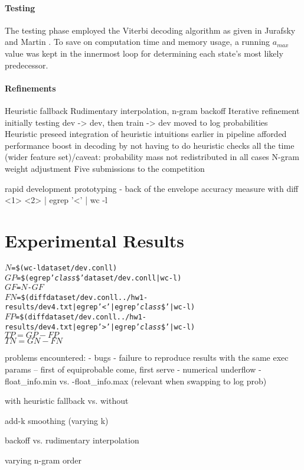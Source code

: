 \documentclass[11pt,a4paper]{article}
\begin{document}
\paragraph{Testing}
The testing phase employed the Viterbi decoding algorithm as given in Jurafsky and
Martin . To save on computation time and memory usage,
a running $a_{max}$ value was kept in the innermost loop for determining each
state's most likely predecessor.

\paragraph{Refinements}
Heuristic fallback
Rudimentary interpolation, n-gram backoff
Iterative refinement initially testing dev -> dev, then train -> dev
moved to log probabilities
Heuristic preseed
integration of heuristic intuitions earlier in pipeline afforded performance boost in decoding by not having to do heuristic checks all the time (wider feature set)/caveat: probability mass not redistributed in all cases
N-gram weight adjustment
Five submissions to the competition

rapid development prototyping - back of the envelope accuracy measure with diff <1> <2> | egrep '<' | wc -l

\section{Experimental Results}

\begin{alltt}
  $N$ = \$(wc -l dataset/dev.conll)
  $GP$ = \$(egrep '\emph{class}\$' dataset/dev.conll | wc -l)
  $GF$ = $N$ - $GF$
  $FN$ = \$(diff dataset/dev.conll ../hw1-results/dev4.txt | egrep '<' | egrep '\emph{class}\$' | wc -l)
  $FP$ = \$(diff dataset/dev.conll ../hw1-results/dev4.txt | egrep '>' | egrep '\emph{class}\$' | wc -l)
  $TP = GP - FP$
  $TN = GN - FN$
\end{alltt}

problems encountered:
- bugs
- failure to reproduce results with the same exec params
-- first of equiprobable come, first serve
- numerical underflow
- float\_info.min vs. -float\_info.max (relevant when swapping to log prob)

with heuristic fallback vs. without

add-k smoothing (varying k)

backoff vs. rudimentary interpolation

varying n-gram order
\end{document}
